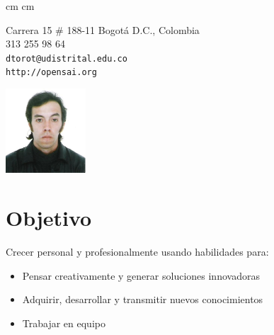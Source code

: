 \documentclass[overlapped,line,final,letterpaper]{res}
\begin{document}

\begin{resume}

 cm
 cm
\begin{minipage}{\linewidth}
	\begin{minipage}{0.5\linewidth} %
    		Carrera 15 \# 188-11  \newline %
    		Bogotá D.C., Colombia \\ %
    		313 255 98 64 \\ %
    		{\tt dtorot@udistrital.edu.co} \\ %
     	{\tt http://opensai.org} \\ %
	\end{minipage}
	\begin{minipage}{0.5\linewidth}
\begin{center}
	\includegraphics[width=3cm, bb=0 0 305 321]{./foto.jpeg}
\end{center}

	\end{minipage}
\end{minipage}


\vspace{0.5cm}
\section{\sc Objetivo}
\vspace{0.5cm}
Crecer personal y profesionalmente usando habilidades para:
\vspace{2mm}
\begin{itemize}
  \item Pensar creativamente y generar soluciones innovadoras
  \item Adquirir, desarrollar y transmitir nuevos conocimientos 
  \item Trabajar en equipo
\end{itemize}


\end{resume}
\end{document}
